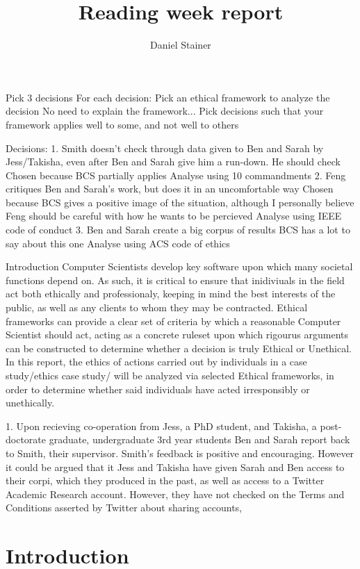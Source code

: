 \documentclass{article}
\title{Reading week report}
\author{Daniel Stainer}
\begin{document}
\maketitle
Pick 3 decisions 
For each decision:
Pick an ethical framework to analyze the decision
No need to explain the framework...
Pick decisions such that your framework applies well to some, and not well to others

Decisions:
1. Smith doesn't check through data given to Ben and Sarah by Jess/Takisha, even after Ben and Sarah give him a run-down. He should check  
Chosen because BCS partially applies
Analyse using 10 commandments
2. Feng critiques Ben and Sarah's work, but does it in an uncomfortable way
Chosen because BCS gives a positive image of the situation, although I personally believe Feng should be careful with how he wants to be percieved
Analyse using IEEE code of conduct
3. Ben and Sarah create a big corpus of results  
BCS has a lot to say about this one
Analyse using ACS code of ethics

Introduction
Computer Scientists develop key software upon which many societal functions depend on. As such, it is critical to ensure that inidiviuals in the field act both ethically and professionaly, keeping in mind the best interests of the public, as well as any clients to whom they may be contracted. Ethical frameworks can provide a clear set of criteria by which a reasonable Computer Scientist should act, acting as a concrete ruleset upon which rigourus arguments can be constructed to determine whether a decision is truly Ethical or Unethical. In this report, the ethics of actions carried out by individuals  in a case study/ethics case study/ will be analyzed via selected Ethical frameworks, in order to determine whether said individuals have acted irresponsibly or unethically.                

1.
Upon recieving co-operation from Jess, a PhD student, and Takisha, a post-doctorate graduate, undergraduate 3rd year students Ben and Sarah report back to Smith, their supervisor. Smith's feedback is positive and encouraging. However it could be argued that it  Jess and Takisha have given Sarah and Ben access to their corpi, which they produced in the past, as well as access to a Twitter Academic Research account. However, they have not checked on the Terms and Conditions asserted by Twitter about sharing accounts,  
 
\section*{Introduction}
\end{document}
